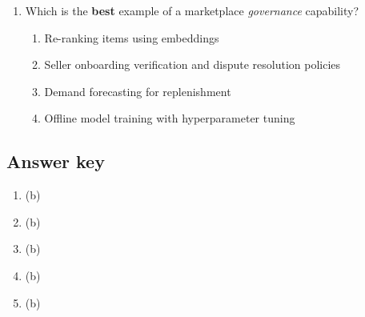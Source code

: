 \begin{enumerate}
  \item Which is the \textbf{best} example of a marketplace \emph{governance} capability?
  \begin{enumerate}
    \item Re-ranking items using embeddings
    \item Seller onboarding verification and dispute resolution policies
    \item Demand forecasting for replenishment
    \item Offline model training with hyperparameter tuning
  \end{enumerate}
\end{enumerate}

\subsection*{Answer key}
\begin{enumerate}
  \item (b)
  \item (b)
  \item (b)
  \item (b)
  \item (b)
\end{enumerate}
